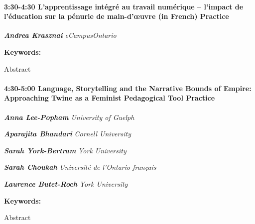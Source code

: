 \documentclass[
]{book}
\begin{document}
\begin{session}
\hypertarget{lapprentissage-intuxe9gruxe9-au-travail-numuxe9rique-limpact-de-luxe9ducation-sur-la-puxe9nurie-de-main-dux153uvre-in-french-practice}{%
\paragraph*{\texorpdfstring{3:30-4:30 \textbar{} \textbf{L'apprentissage
intégré au travail numérique -- l'impact de l'éducation sur la pénurie
de main-d'œuvre (in French)} \textbar{}
Practice}{3:30-4:30 \textbar{} L'apprentissage intégré au travail numérique -- l'impact de l'éducation sur la pénurie de main-d'œuvre (in French) \textbar{} Practice}}\label{lapprentissage-intuxe9gruxe9-au-travail-numuxe9rique-limpact-de-luxe9ducation-sur-la-puxe9nurie-de-main-dux153uvre-in-french-practice}}

\textbf{\emph{Andrea Krasznai}} \textbar{} \emph{eCampusOntario}

\textbf{Keywords:}

Abstract
\end{session}

\begin{session}
\hypertarget{language-storytelling-and-the-narrative-bounds-of-empire-approaching-twine-as-a-feminist-pedagogical-tool-practice}{%
\paragraph*{\texorpdfstring{4:30-5:00 \textbar{} \textbf{Language,
Storytelling and the Narrative Bounds of Empire: Approaching Twine as a
Feminist Pedagogical Tool} \textbar{}
Practice}{4:30-5:00 \textbar{} Language, Storytelling and the Narrative Bounds of Empire: Approaching Twine as a Feminist Pedagogical Tool \textbar{} Practice}}\label{language-storytelling-and-the-narrative-bounds-of-empire-approaching-twine-as-a-feminist-pedagogical-tool-practice}}

\textbf{\emph{Anna Lee-Popham}} \textbar{} \emph{University of Guelph}

\textbf{\emph{Aparajita Bhandari}} \textbar{} \emph{Cornell University}

\textbf{\emph{Sarah York-Bertram}} \textbar{} \emph{York University}

\textbf{\emph{Sarah Choukah}} \textbar{} \emph{Université de l'Ontario
français}

\textbf{\emph{Laurence Butet-Roch}} \textbar{} \emph{York University}

\textbf{Keywords:}

Abstract
\end{session}
\end{document}
